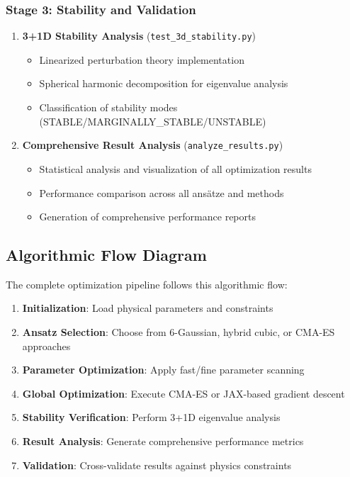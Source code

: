 \documentclass[11pt,a4paper]{article}
\begin{document}
\begin{table}[h]
\begin{table}[h]
\begin{table}[h]
\subsubsection{Stage 3: Stability and Validation}

\begin{enumerate}
\item \textbf{3+1D Stability Analysis} (\texttt{test\_3d\_stability.py})
   \begin{itemize}
   \item Linearized perturbation theory implementation
   \item Spherical harmonic decomposition for eigenvalue analysis
   \item Classification of stability modes (STABLE/MARGINALLY\_STABLE/UNSTABLE)
   \end{itemize}

\item \textbf{Comprehensive Result Analysis} (\texttt{analyze\_results.py})
   \begin{itemize}
   \item Statistical analysis and visualization of all optimization results
   \item Performance comparison across all ansätze and methods
   \item Generation of comprehensive performance reports
   \end{itemize}
\end{enumerate}

\subsection{Algorithmic Flow Diagram}

The complete optimization pipeline follows this algorithmic flow:

\begin{enumerate}
\item \textbf{Initialization}: Load physical parameters and constraints
\item \textbf{Ansatz Selection}: Choose from 6-Gaussian, hybrid cubic, or CMA-ES approaches
\item \textbf{Parameter Optimization}: Apply fast/fine parameter scanning
\item \textbf{Global Optimization}: Execute CMA-ES or JAX-based gradient descent
\item \textbf{Stability Verification}: Perform 3+1D eigenvalue analysis
\item \textbf{Result Analysis}: Generate comprehensive performance metrics
\item \textbf{Validation}: Cross-validate results against physics constraints
\end{enumerate}


\end{table}
\end{table}
\end{table}
\end{document}

